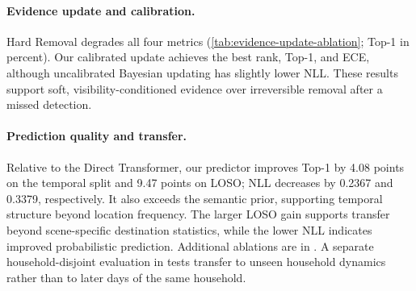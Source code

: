 \paragraph{Evidence update and calibration.}
Hard Removal degrades all four metrics (\cref{tab:evidence-update-ablation};
Top-1 in percent). Our calibrated update achieves the best rank, Top-1, and
ECE, although uncalibrated Bayesian updating has slightly lower NLL. These
results support soft, visibility-conditioned evidence over irreversible
removal after a missed detection.


\begin{table}
\vspace{-0.7\baselineskip}
\caption{Current-state prediction on temporal and LOSO splits.}
\label{tab:predictors}
\centering
\scriptsize
\setlength{\tabcolsep}{2.3pt}
\end{table}

\paragraph{Prediction quality and transfer.}
Relative to the Direct Transformer, our predictor improves Top-1 by 4.08 points
on the temporal split and 9.47 points on LOSO; NLL decreases by 0.2367 and
0.3379, respectively. It also exceeds the semantic
prior, supporting temporal structure beyond location frequency. The larger LOSO
gain supports transfer beyond scene-specific destination statistics, while the
lower NLL indicates improved probabilistic prediction. Additional ablations
are in . A separate household-disjoint
evaluation in  tests transfer to unseen household
dynamics rather than to later days of the same household.
